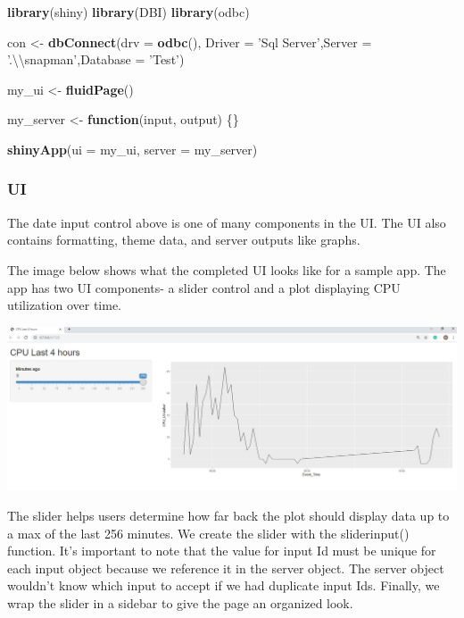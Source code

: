 \documentclass[]{article}
\newenvironment{Shaded}{\begin{snugshade}}{\end{snugshade}}
\newcommand{\CharTok}[1]{\textcolor[rgb]{0.31,0.60,0.02}{#1}}
\newcommand{\ControlFlowTok}[1]{\textcolor[rgb]{0.13,0.29,0.53}{\textbf{#1}}}
\newcommand{\DataTypeTok}[1]{\textcolor[rgb]{0.13,0.29,0.53}{#1}}
\newcommand{\KeywordTok}[1]{\textcolor[rgb]{0.13,0.29,0.53}{\textbf{#1}}}
\newcommand{\NormalTok}[1]{#1}
\newcommand{\StringTok}[1]{\textcolor[rgb]{0.31,0.60,0.02}{#1}}
\begin{document}
\begin{Shaded}
\begin{Highlighting}[]
\KeywordTok{library}\NormalTok{(shiny)}
\KeywordTok{library}\NormalTok{(DBI)}
\KeywordTok{library}\NormalTok{(odbc)}

\NormalTok{con <-}\StringTok{ }\KeywordTok{dbConnect}\NormalTok{(}\DataTypeTok{drv =} \KeywordTok{odbc}\NormalTok{(),  }\DataTypeTok{Driver =} \StringTok{'Sql Server'}\NormalTok{,}\DataTypeTok{Server =} \StringTok{'.}\CharTok{\textbackslash{}\textbackslash{}}\StringTok{snapman'}\NormalTok{,}\DataTypeTok{Database =} \StringTok{'Test'}\NormalTok{)}

\NormalTok{my_ui <-}\StringTok{ }\KeywordTok{fluidPage}\NormalTok{()}
 
\NormalTok{my_server <-}\StringTok{ }\ControlFlowTok{function}\NormalTok{(input, output) \{\}}

\KeywordTok{shinyApp}\NormalTok{(}\DataTypeTok{ui =}\NormalTok{ my_ui, }\DataTypeTok{server =}\NormalTok{ my_server)}
\end{Highlighting}
\end{Shaded}

\hypertarget{ui}{%
\subsubsection{UI}\label{ui}}

The date input control above is one of many components in the UI. The UI
also contains formatting, theme data, and server outputs like graphs.

The image below shows what the completed UI looks like for a sample app.
The app has two UI components- a slider control and a plot displaying
CPU utilization over time.

\includegraphics{./Images/BaseApp.JPG}

The slider helps users determine how far back the plot should display
data up to a max of the last 256 minutes. We create the slider with the
sliderinput() function. It's important to note that the value for input
Id must be unique for each input object because we reference it in the
server object. The server object wouldn't know which input to accept if
we had duplicate input Ids. Finally, we wrap the slider in a sidebar to
give the page an organized look.
\end{document}
